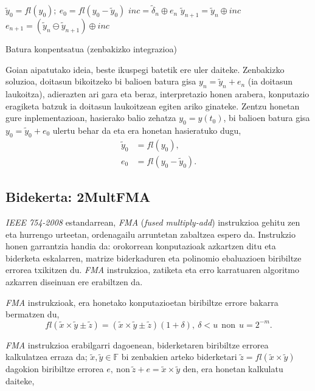 \begin{algorithm}[H]
 \BlankLine
  $\tilde{y}_{0}=fl(y_{0}); \ e_0=fl(y_0-\tilde{y}_0)$\;
 \BlankLine
  {
   \BlankLine
    $inc=\tilde {\delta}_n \oplus e_n$\;
    $\tilde {y}_{n+1}=\tilde{y}_n \oplus inc$\;
    $e_{n+1}=(\tilde{y}_n \ominus \tilde {y}_{n+1}) \oplus inc$\;
   \BlankLine
  }
 \caption{Batura konpentsatua (zenbakizko integrazioa)}
 \label{alg:batkp}
\end{algorithm}


Goian aipatutako ideia,  beste ikuspegi batetik ere uler daiteke. Zenbakizko soluzioa, doitasun bikoitzeko bi balioen batura gisa $y_n=\tilde{y}_n+e_n$ (ia doitasun laukoitza), adierazten ari gara  eta beraz, interpretazio honen arabera, konputazio eragiketa batzuk ia doitasun laukoitzean egiten ariko ginateke. Zentzu honetan gure inplementazioan, hasierako balio zehatza $y_0=y(t_0)$, bi balioen batura gisa $y_0=\tilde{y}_0+e_0$ ulertu behar da eta era honetan hasieratuko dugu,
\begin{align*}
\tilde{y}_0 &=fl(y_0) ,\\
e_0 &=fl(y_0-\tilde{y}_0).
\end{align*}

\subsection*{Bidekerta: 2MultFMA}

\emph{IEEE 754-2008} estandarrean, \emph{FMA} \cite{Muller2009} (\emph{fused multiply-add}) instrukzioa gehitu zen eta hurrengo urteetan, ordenagailu arruntetan zabaltzea espero da. Instrukzio honen garrantzia handia da: orokorrean konputazioak azkartzen ditu eta biderketa eskalarren, matrize biderkaduren eta polinomio ebaluazioen biribiltze errorea txikitzen du. \emph{FMA} instrukzioa, zatiketa eta erro karratuaren algoritmo azkarren diseinuan ere erabiltzen da.

\emph{FMA} instrukzioak, era honetako konputazioetan biribiltze errore bakarra bermatzen du,
\begin{equation*}
fl(\tilde x \times \tilde y \pm \tilde z)= (\tilde x \times \tilde y\pm \tilde z) (1+\delta), \ \delta<u \ \ \text{non} \ \ u=2^{-m}.
\end{equation*}
 

\emph{FMA}  instrukzioa erabilgarri dagoenean, biderketaren biribiltze errorea kalkulatzea erraza da; $\tilde x,\tilde y \in \mathbb{F}$ bi zenbakien arteko biderketari $\tilde z= fl(\tilde x \times \tilde y)$ dagokion biribiltze errorea $e, \ \text{non} \  \tilde{z}+ e=\tilde x \times \tilde y$ den, era honetan kalkulatu daiteke,

